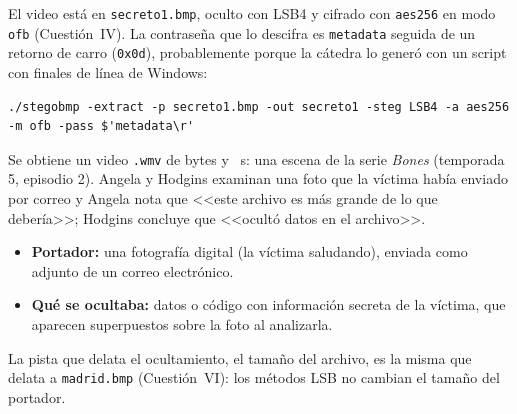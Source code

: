 
El video está en \texttt{secreto1.bmp}, oculto con LSB4 y cifrado con \texttt{aes256} en modo \texttt{ofb} (Cuestión~IV). La contraseña que lo descifra
es \texttt{metadata} seguida de un retorno de carro (\texttt{0x0d}), probablemente porque la cátedra lo generó con un script con finales de línea de Windows:
\begin{lstlisting}
./stegobmp -extract -p secreto1.bmp -out secreto1 -steg LSB4 -a aes256 -m ofb -pass $'metadata\r'
\end{lstlisting}
Se obtiene un video \texttt{.wmv} de  bytes y ~s: una escena de la serie \emph{Bones}
(temporada 5, episodio 2). Angela y Hodgins examinan una foto que la víctima había enviado por correo y Angela nota que <<este archivo es más grande de lo que debería>>;
Hodgins concluye que <<ocultó datos en el archivo>>.

\begin{itemize}
\item \textbf{Portador:} una fotografía digital (la víctima saludando), enviada como adjunto de un correo electrónico.
\item \textbf{Qué se ocultaba:} datos o código con información secreta de la víctima, que aparecen superpuestos sobre la foto al analizarla.
\end{itemize}

La pista que delata el ocultamiento, el tamaño del archivo, es la misma que delata a \texttt{madrid.bmp} (Cuestión~VI): los métodos LSB no cambian el tamaño del portador.
